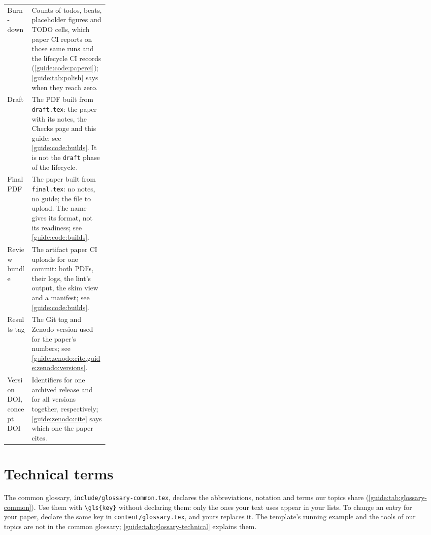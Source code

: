 {\begin{xltabular}{\linewidth}{>{\raggedright\arraybackslash}p{0.24\linewidth} X}
  Burn-down & Counts of todos, beats, placeholder figures and TODO cells, which paper CI reports on those same runs and the lifecycle CI records (\cref{guide:code:paperci}); \cref{guide:tab:polish} says when they reach zero. \\
  Draft & The PDF built from \texttt{draft.tex}: the paper with its notes, the Checks page and this guide; see \cref{guide:code:builds}. It is not the \texttt{draft} phase of the lifecycle. \\
  Final PDF & The paper built from \texttt{final.tex}: no notes, no guide; the file to upload. The name gives its format, not its readiness; see \cref{guide:code:builds}. \\
  Review bundle & The artifact paper CI uploads for one commit: both PDFs, their logs, the lint's output, the skim view and a manifest; see \cref{guide:code:builds}. \\
  Results tag & The Git tag and Zenodo version used for the paper's numbers; see \cref{guide:zenodo:cite,guide:zenodo:versions}. \\
  Version DOI, concept DOI & Identifiers for one archived release and for all versions together, respectively; \cref{guide:zenodo:cite} says which one the paper cites. \\
\end{xltabular}
}

\section{Technical terms}
The common glossary, \texttt{include/glossary-common.tex}, declares the abbreviations, notation and terms our topics share (\cref{guide:tab:glossary-common}). Use them with \texttt{\textbackslash gls\{key\}} without declaring them: only the ones your text uses appear in your lists. To change an entry for your paper, declare the same key in \texttt{content/glossary.tex}, and yours replaces it. The template's running example and the tools of our topics are not in the common glossary; \cref{guide:tab:glossary-technical} explains them.

